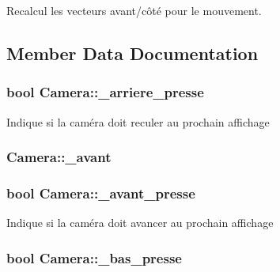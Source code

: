 Recalcul les vecteurs avant/côté pour le mouvement. 



\subsection{Member Data Documentation}
\hypertarget{class_camera_a0ce12f74953fcd53192e48f8b4164e2e}{
\subsubsection[{\+\_\+arriere\+\_\+presse}]{\setlength{\rightskip}{0pt plus 5cm}bool Camera\+::\+\_\+arriere\+\_\+presse}}\label{class_camera_a0ce12f74953fcd53192e48f8b4164e2e}
Indique si la caméra doit reculer au prochain affichage \hypertarget{class_camera_ab7cf8c1eae6b2f35a20e8abd1f0570c9}{
\subsubsection[{\+\_\+avant}]{ Camera\+::\+\_\+avant\hspace{0.3cm}{\ttfamily [protected]}}}\label{class_camera_ab7cf8c1eae6b2f35a20e8abd1f0570c9}
\hypertarget{class_camera_a4cab15e35a96fdcb2a8599fea13a9b8f}{
\subsubsection[{\+\_\+avant\+\_\+presse}]{\setlength{\rightskip}{0pt plus 5cm}bool Camera\+::\+\_\+avant\+\_\+presse}}\label{class_camera_a4cab15e35a96fdcb2a8599fea13a9b8f}
Indique si la caméra doit avancer au prochain affichage \hypertarget{class_camera_aaba6828f97c9ef07b6b135a665bd3008}{
\subsubsection[{\+\_\+bas\+\_\+presse}]{\setlength{\rightskip}{0pt plus 5cm}bool Camera\+::\+\_\+bas\+\_\+presse}}\label{class_camera_aaba6828f97c9ef07b6b135a665bd3008}
